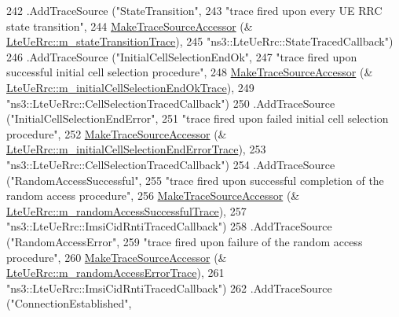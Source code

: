 \begin{DoxyCode}
242     .AddTraceSource (\textcolor{stringliteral}{"StateTransition"},
243                      \textcolor{stringliteral}{"trace fired upon every UE RRC state transition"},
244                      \hyperlink{group__tracing_gab21a770b9855af4e8f69f7531ea4a6b0}{MakeTraceSourceAccessor} (&
      \hyperlink{classns3_1_1LteUeRrc_a269fed2358610ca08549e8d1f211623b}{LteUeRrc::m\_stateTransitionTrace}),
245                      \textcolor{stringliteral}{"ns3::LteUeRrc::StateTracedCallback"})
246     .AddTraceSource (\textcolor{stringliteral}{"InitialCellSelectionEndOk"},
247                      \textcolor{stringliteral}{"trace fired upon successful initial cell selection procedure"},
248                      \hyperlink{group__tracing_gab21a770b9855af4e8f69f7531ea4a6b0}{MakeTraceSourceAccessor} (&
      \hyperlink{classns3_1_1LteUeRrc_a84f159549c4095a94197657e51215062}{LteUeRrc::m\_initialCellSelectionEndOkTrace}),
249                      \textcolor{stringliteral}{"ns3::LteUeRrc::CellSelectionTracedCallback"})
250     .AddTraceSource (\textcolor{stringliteral}{"InitialCellSelectionEndError"},
251                      \textcolor{stringliteral}{"trace fired upon failed initial cell selection procedure"},
252                      \hyperlink{group__tracing_gab21a770b9855af4e8f69f7531ea4a6b0}{MakeTraceSourceAccessor} (&
      \hyperlink{classns3_1_1LteUeRrc_a32e24fd29de39fe7397235348e6a32d7}{LteUeRrc::m\_initialCellSelectionEndErrorTrace}),
253                      \textcolor{stringliteral}{"ns3::LteUeRrc::CellSelectionTracedCallback"})
254     .AddTraceSource (\textcolor{stringliteral}{"RandomAccessSuccessful"},
255                      \textcolor{stringliteral}{"trace fired upon successful completion of the random access procedure"},
256                      \hyperlink{group__tracing_gab21a770b9855af4e8f69f7531ea4a6b0}{MakeTraceSourceAccessor} (&
      \hyperlink{classns3_1_1LteUeRrc_ad5da54bebd73bd18a6ccbd77b5a87d09}{LteUeRrc::m\_randomAccessSuccessfulTrace}),
257                      \textcolor{stringliteral}{"ns3::LteUeRrc::ImsiCidRntiTracedCallback"})
258     .AddTraceSource (\textcolor{stringliteral}{"RandomAccessError"},
259                      \textcolor{stringliteral}{"trace fired upon failure of the random access procedure"},
260                      \hyperlink{group__tracing_gab21a770b9855af4e8f69f7531ea4a6b0}{MakeTraceSourceAccessor} (&
      \hyperlink{classns3_1_1LteUeRrc_a6cde93dc9b01ce7248865b64d7e2e595}{LteUeRrc::m\_randomAccessErrorTrace}),
261                      \textcolor{stringliteral}{"ns3::LteUeRrc::ImsiCidRntiTracedCallback"})
262     .AddTraceSource (\textcolor{stringliteral}{"ConnectionEstablished"},

\end{DoxyCode}

